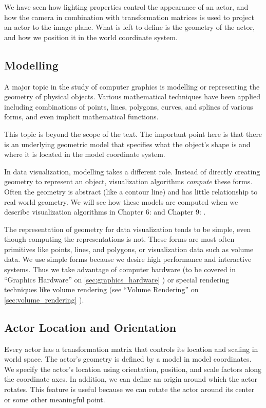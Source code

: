 We have seen how lighting properties control the appearance of an actor, and how the camera in combination with transformation matrices is used to project an actor to the image plane. What is left to define is the geometry of the actor, and how we position it in the world coordinate system.

\subsection{Modelling}

A major topic in the study of computer graphics is modelling or representing the geometry of physical objects. Various mathematical techniques have been applied including combinations of points, lines, polygons, curves, and splines of various forms, and even implicit mathematical functions.

This topic is beyond the scope of the text. The important point here is that there is an underlying geometric model that specifies what the object's shape is and where it is located in the model coordinate system.

In data visualization, modelling takes a different role. Instead of directly creating geometry to represent an object, visualization algorithms \emph{compute} these forms. Often the geometry is abstract (like a contour line) and has little relationship to real world geometry. We will see how these models are computed when we describe visualization algorithms in Chapter 6:  and Chapter 9: .

The representation of geometry for data visualization tends to be simple, even though computing the representations is not. These forms are most often primitives like points, lines, and polygons, or visualization data such as volume data. We use simple forms because we desire high performance and interactive systems. Thus we take advantage of computer hardware (to be covered in ``Graphics Hardware'' on \ref{sec:graphics_hardware} ) or special rendering techniques like volume rendering (see ``Volume Rendering'' on \ref{sec:volume_rendering} ).

\subsection{Actor Location and Orientation}

Every actor has a transformation matrix that controls its location and scaling in world space. The actor's geometry is defined by a model in model coordinates. We specify the actor's location using orientation, position, and scale factors along the coordinate axes. In addition, we can define an origin around which the actor rotates. This feature is useful because we can rotate the actor around its center or some other meaningful point.

